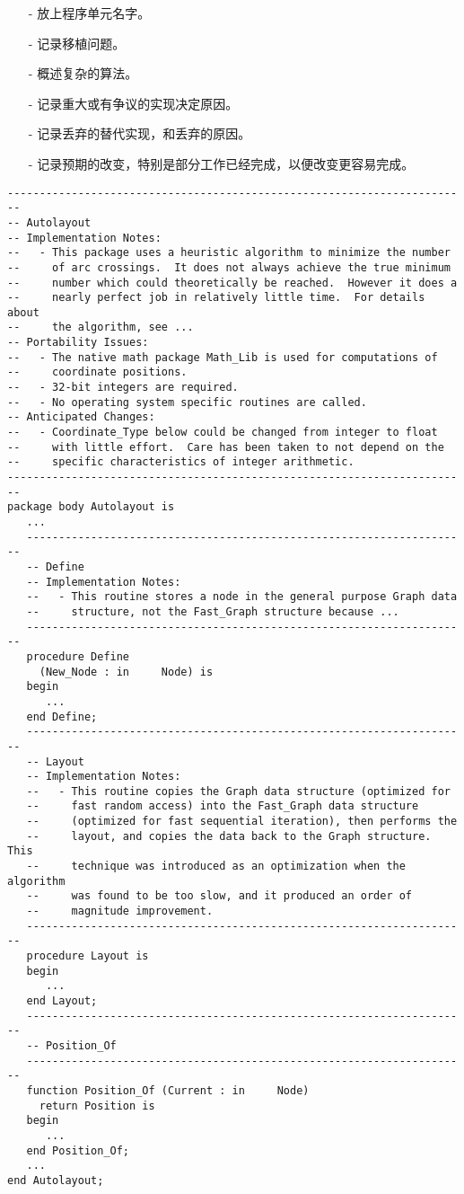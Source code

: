 \begin{itemize}
    \item[-] 放上程序单元名字。
    \item[-] 记录移植问题。
    \item[-] 概述复杂的算法。
    \item[-] 记录重大或有争议的实现决定原因。
    \item[-] 记录丢弃的替代实现，和丢弃的原因。
    \item[-] 记录预期的改变，特别是部分工作已经完成，以便改变更容易完成。
\end{itemize}

\begin{lstlisting}
------------------------------------------------------------------------
-- Autolayout
-- Implementation Notes:
--   - This package uses a heuristic algorithm to minimize the number
--     of arc crossings.  It does not always achieve the true minimum
--     number which could theoretically be reached.  However it does a
--     nearly perfect job in relatively little time.  For details about
--     the algorithm, see ...
-- Portability Issues:
--   - The native math package Math_Lib is used for computations of
--     coordinate positions.
--   - 32-bit integers are required.
--   - No operating system specific routines are called.
-- Anticipated Changes:
--   - Coordinate_Type below could be changed from integer to float
--     with little effort.  Care has been taken to not depend on the
--     specific characteristics of integer arithmetic.
------------------------------------------------------------------------
package body Autolayout is
   ...
   ---------------------------------------------------------------------
   -- Define
   -- Implementation Notes:
   --   - This routine stores a node in the general purpose Graph data
   --     structure, not the Fast_Graph structure because ...
   ---------------------------------------------------------------------
   procedure Define
	 (New_Node : in     Node) is
   begin
      ...
   end Define;
   ---------------------------------------------------------------------
   -- Layout
   -- Implementation Notes:
   --   - This routine copies the Graph data structure (optimized for
   --     fast random access) into the Fast_Graph data structure
   --     (optimized for fast sequential iteration), then performs the
   --     layout, and copies the data back to the Graph structure.  This
   --     technique was introduced as an optimization when the algorithm
   --     was found to be too slow, and it produced an order of
   --     magnitude improvement.
   ---------------------------------------------------------------------
   procedure Layout is
   begin
      ...
   end Layout;
   ---------------------------------------------------------------------
   -- Position_Of
   ---------------------------------------------------------------------
   function Position_Of (Current : in     Node)
	 return Position is
   begin
      ...
   end Position_Of;
   ...
end Autolayout;
\end{lstlisting}

